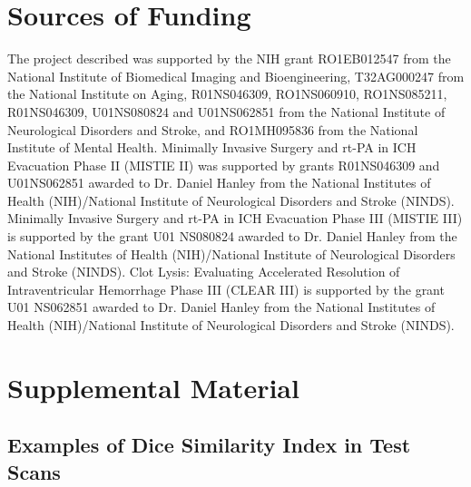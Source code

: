 \documentclass{elsarticle_nonatbib}\usepackage[]{graphicx}\usepackage[]{color}
\begin{document}
\section*{Sources of Funding}
The project described was supported by the NIH grant RO1EB012547 from the National Institute of Biomedical Imaging and Bioengineering, T32AG000247 from the National Institute on Aging, R01NS046309, RO1NS060910, RO1NS085211, R01NS046309, U01NS080824 and U01NS062851 from the National Institute of Neurological Disorders and Stroke, and RO1MH095836 from the National Institute of Mental Health. Minimally Invasive Surgery and rt-PA in ICH Evacuation Phase II (MISTIE II) was supported by grants R01NS046309 and U01NS062851 awarded to Dr. Daniel Hanley from the National Institutes of Health (NIH)/National Institute of Neurological Disorders and Stroke (NINDS).  Minimally Invasive Surgery and rt-PA in ICH Evacuation Phase III (MISTIE III) is supported by the grant U01 NS080824 awarded to Dr. Daniel Hanley from the National Institutes of Health (NIH)/National Institute of Neurological Disorders and Stroke (NINDS). Clot Lysis: Evaluating Accelerated Resolution of Intraventricular Hemorrhage Phase III (CLEAR III) is supported by the grant U01 NS062851 awarded to Dr. Daniel Hanley from the National Institutes of Health (NIH)/National Institute of Neurological Disorders and Stroke (NINDS).

\newpage
%
%
%
\printbibliography

\clearpage
\section{Supplemental Material}

\setcounter{figure}{0}
\makeatletter 
\renewcommand{\thefigure}{S\@arabic\c@figure}
\makeatother

\subsection{Examples of Dice Similarity Index in Test Scans}
\end{document}
